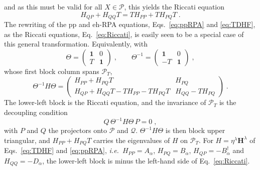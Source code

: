 \documentclass[aip,jcp,reprint,noshowkeys,superscriptaddress]{revtex4-1}
\newcommand{\ie}{\textit{i.e.}}
\newcommand{\bI}{\boldsymbol{1}}
\newcommand{\eh}{\text{eh}}
\newcommand{\pp}{\text{pp}}
\begin{document}
and as this must be valid for all $X \in \mathcal{P}$, this yields the Riccati 
equation 
\begin{equation}
	H_{QP} + H_{QQ}T = TH_{PP} + T H_{PQ}T \;.
\end{equation}
The rewriting of the $\pp$ and $\eh$-RPA equations, Eqs.~\eqref{eq:ppRPA} and \eqref{eq:TDHF}, as the Riccati equations, Eq.~\eqref{eq:Riccati}, is 
easily seen to be a special case of this general transformation. 
Equivalently, with
\begin{equation}
	\Theta =
		\begin{pmatrix}
		\bI & 0 \\ T & \bI
	\end{pmatrix} \;,
	\qquad
	\Theta^{-1} =
	\begin{pmatrix}
		\bI & 0 \\ -T & \bI
	\end{pmatrix} \;,
\end{equation}
whose first block column spans $\mathcal{P}_T$,
\begin{equation}
	\Theta^{-1}H\Theta =
	\begin{pmatrix}
		H_{PP} + H_{PQ}T & H_{PQ} \\
		H_{QP} + H_{QQ}T - TH_{PP} - TH_{PQ}T & H_{QQ} - TH_{PQ}
	\end{pmatrix} \;.
	\label{eq:SHS_Riccati}
\end{equation}
The lower-left block is the Riccati equation, and the invariance of
$\mathcal{P}_T$ is the decoupling condition
\begin{equation}
	Q\,\Theta^{-1}H\Theta\,P = 0 \;,
	\label{eq:PQ_decoupling}
\end{equation}
with $P$ and $Q$ the projectors onto $\mathcal{P}$ and $\mathcal{Q}$.
$\Theta^{-1}H\Theta$ is then block upper triangular, and $H_{PP}+H_{PQ}T$ carries
the eigenvalues of $H$ on $\mathcal{P}_T$.
For $H=\eta^\lambda\mathbf H^\lambda$ of Eqs.~\eqref{eq:TDHF} and \eqref{eq:ppRPA}, \ie\
$H_{PP}=A_\alpha$, $H_{PQ}=B_\alpha$, $H_{QP}=-B_\alpha^\dagger$ and
$H_{QQ}=-D_\alpha$, the lower-left block is minus the left-hand side of
Eq.~\eqref{eq:Riccati}.
\end{document}
